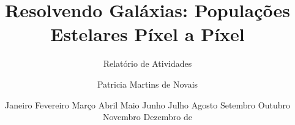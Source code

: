 
\title{\textbf{Resolvendo Galáxias: Populações Estelares Píxel a Píxel}}

\subtitle{Relatório de Atividades}

\author{\large{Patricia Martins de Novais}}


\date{\ifcase\month\or Janeiro \or Fevereiro \or Março \or Abril \or Maio \or Junho \or Julho \or Agosto \or Setembro \or Outubro \or Novembro \or Dezembro \fi de \number\year}


